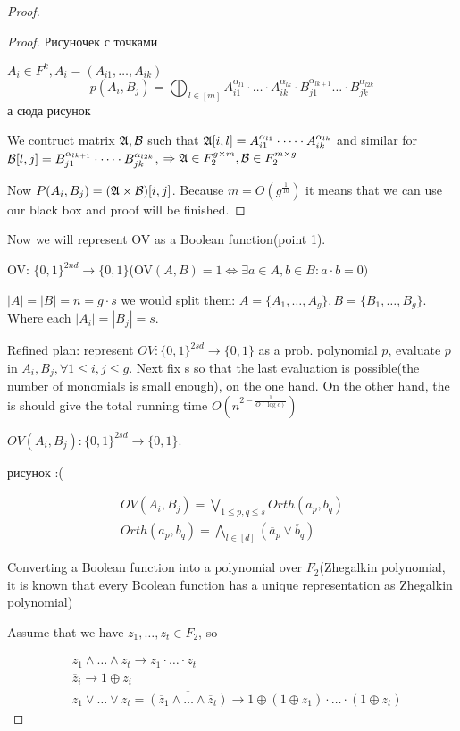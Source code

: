 \begin{proof}
\begin{proof}
		{\color{red} Рисуночек с точками}

		$A_i \in F^k, A_i = (A_{i 1}, \dots, A_{i k})$
		\[
			p(A_i, B_j) = \bigoplus_{l \in [m]} A_{i 1}^{\alpha_{l 1}} \cdot \dots \cdot A_{i k}^{\alpha_{l k}} \cdot B_{j 1}^{\alpha_{l k + 1} } \dots \cdot B_{j k}^{\alpha_{l 2k}}
		\]
		{\color{red} а сюда рисунок}

		We contruct matrix $\mathfrak{A}, \mathcal{B}$ such that $\mathfrak{A}[i, l] = A_{i 1}^{\alpha_{l 1}} \cdot \dots \cdot A_{i k}^{\alpha_{l k}}$ and similar for $\mathcal{B}[l, j] = B_{j 1}^{\alpha_{l k + 1}} \cdot \dots \cdot B_{j k}^{\alpha_{l 2k}}$, $\Rightarrow \mathfrak{A} \in F_2^{g \times m}, \mathcal{B} \in F_2^{m \times g}$

		Now $P(A_i, B_j) = (\mathfrak{A} \times \mathcal{B})[i, j]$. Because $m = O(g^{\frac{1}{10}})$ it means that we can use our black box and proof will be finished.
	\end{proof}

	Now we will represent OV as a Boolean function(point 1).

	OV: $\{0, 1\}^{2nd} \to \{0, 1\}$(OV$(A, B) = 1 \Leftrightarrow \exists a \in A, b \in B : a \cdot b = 0 )$

	$|A| = |B| = n = g \cdot s$ we would split them: $A = \{ A_1, \dots, A_g\}, B = \{B_1, \dots, B_g\}$.
	Where each $|A_i| = |B_j| = s$.

	Refined plan: represent $OV : \{0, 1\}^{2sd} \to \{0, 1\}$ as a prob. polynomial $p$,  evaluate $p$ in $A_i, B_j, \forall 1 \leq i, j \leq g$.
	Next fix s so that the last evaluation is possible(the number of monomials is small enough), on the one hand. On the other hand, the is should give the total running time $O(n^{2 - \frac{1}{O(\log c)}})$

	$OV(A_i, B_j) : \{0, 1\}^{2sd} \to \{0, 1\}$.

	{\color{red} рисунок :(}

	\begin{align*}
		OV(A_i, B_j) = \bigvee_{1 \leq p, q \leq s} Orth(a_p, b_q) \\
		Orth(a_p, b_q) = \bigwedge_{l \in [d]} \left(\overline a_p \lor \overline b_q\right)
	\end{align*}

	Converting a Boolean function into a polynomial over $F_2$(Zhegalkin polynomial, it is known that every Boolean function has a unique representation as Zhegalkin polynomial)

	Assume that we have $z_1, \dots, z_t \in F_2$, so

	\begin{align*}
		&z_1 \land \dots \land z_t \to z_1 \cdot \dots \cdot z_t \\
		&\overline z_i \to 1 \oplus z_i \\
		&z_1 \lor \dots \lor z_t = \overline{(\overline z_1 \land \dots \land \overline z_t)} \to 1 \oplus (1 \oplus z_1) \cdot \dots \cdot (1 \oplus z_t)
	\end{align*}


\end{proof}
